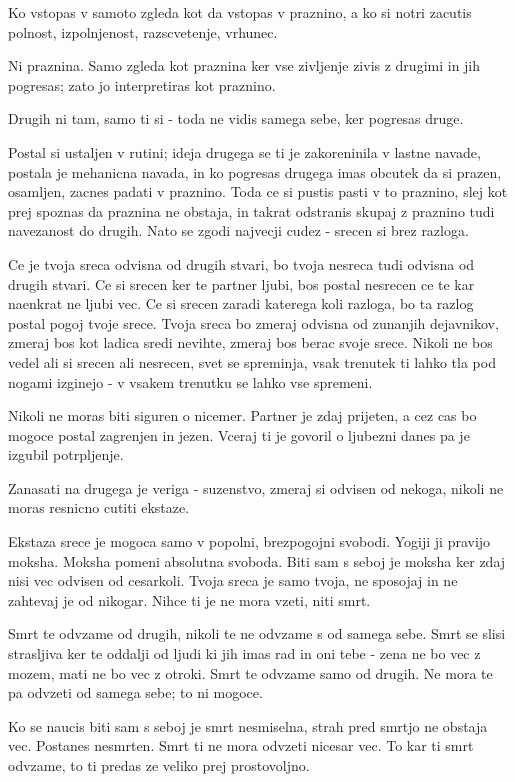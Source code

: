 Ko vstopas v samoto zgleda kot da vstopas v praznino, a ko si notri zacutis polnost, izpolnjenost, razscvetenje, vrhunec. 

Ni praznina. Samo zgleda kot praznina ker vse zivljenje zivis z drugimi in jih pogresas; zato jo interpretiras kot praznino. 

Drugih ni tam, samo ti si - toda ne vidis samega sebe, ker pogresas druge. 

Postal si ustaljen v rutini; ideja drugega se ti je zakoreninila v lastne navade, postala je mehanicna navada, in ko pogresas drugega imas obcutek da si prazen, osamljen, zacnes padati v praznino. Toda ce si pustis pasti v to praznino, slej kot prej spoznas da praznina ne obstaja, in takrat odstranis skupaj z praznino tudi navezanost do drugih. Nato se zgodi najvecji cudez - srecen si brez razloga. 

Ce je tvoja sreca odvisna od drugih stvari, bo tvoja nesreca tudi odvisna od drugih stvari. Ce si srecen ker te partner ljubi, bos postal nesrecen ce te kar naenkrat ne ljubi vec. Ce si srecen zaradi katerega koli razloga, bo ta razlog postal pogoj tvoje srece. Tvoja sreca bo zmeraj odvisna od zunanjih dejavnikov, zmeraj bos kot ladica sredi nevihte, zmeraj bos berac svoje srece. Nikoli ne bos vedel ali si srecen ali nesrecen, svet se spreminja, vsak trenutek ti lahko tla pod nogami izginejo - v vsakem trenutku se lahko vse spremeni. 

Nikoli ne moras biti siguren o nicemer. Partner je zdaj prijeten, a cez cas bo mogoce postal zagrenjen in jezen. Vceraj ti je govoril o ljubezni danes pa je izgubil potrpljenje. 

Zanasati na drugega je veriga - suzenstvo, zmeraj si odvisen od nekoga, nikoli ne moras resnicno cutiti ekstaze. 

Ekstaza srece je mogoca samo v popolni, brezpogojni svobodi. Yogiji ji pravijo moksha. Moksha pomeni absolutna svoboda. Biti sam s seboj je moksha ker zdaj nisi vec odvisen od cesarkoli. Tvoja sreca je samo tvoja, ne sposojaj in ne zahtevaj je od nikogar. Nihce ti je ne mora vzeti, niti smrt. 

Smrt te odvzame od drugih, nikoli te ne odvzame s od samega sebe. Smrt se slisi strasljiva ker te oddalji od ljudi ki jih imas rad in oni tebe - zena ne bo vec z mozem, mati ne bo vec z otroki. Smrt te odvzame samo od drugih. Ne mora te pa odvzeti od samega sebe; to ni mogoce. 

Ko se naucis biti sam s seboj je smrt nesmiselna, strah pred smrtjo ne obstaja vec. Postanes nesmrten. Smrt ti ne mora odvzeti nicesar vec. To kar ti smrt odvzame, to ti predas ze veliko prej prostovoljno. 


